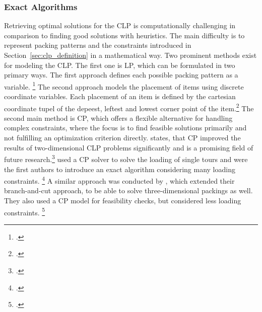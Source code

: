 \subsubsection{Exact Algorithms}
Retrieving optimal solutions for the \gls{CLP} is computationally challenging in comparison
to finding good solutions with heuristics. The main difficulty is to represent packing
patterns and the constraints introduced in Section~\ref{sec:clp_definition} in a mathematical way.
Two prominent methods exist for modeling the \gls{CLP}. The first one is \gls{LP}, which can be
formulated in two primary ways. The first approach defines each possible packing pattern as
a variable. \footcite[cf.][pp. 29--30]{zhu_prototype_2012} The second approach models
the placement of items using discrete coordinate variables. Each placement of an item
is defined by the cartesian coordinate tupel of the depeest, leftest and lowest corner point of
the item.\footcites(cf.)()[][pp. 649-653]{junqueira_optimization_2013}[][pp. 4--8]{moura_integrated_2009}
The second main method is \gls{CP}, which offers a flexible alternative for handling
complex constraints, where the focus is to find feasible solutions primarily and
not fulfilling an optimization criterion directly. \textcite{iori_exact_2021} states, that
\gls{CP} improved the results of two-dimensional \gls{CLP} problems significantly and is a promising
field of future research.\footcite[cf.][p. 23]{iori_exact_2021} \cite{tamke_branch-and-cut_2024} used a \gls{CP} solver
to solve the loading of single tours and were the first authors to introduce an exact algorithm
considering many loading constraints. \footcite[cf.][pp. 7--11]{tamke_branch-and-cut_2024}
A similar approach was conducted by \cite{hokama_branch-and-cut_2016}, which extended their
branch-and-cut approach, to be able to solve three-dimensional packings as well.
They also used a \gls{CP} model for feasibility checks, but considered less loading constraints. \footcite[cf.][]{hokama_branch-and-cut_2016}

\parbreak

